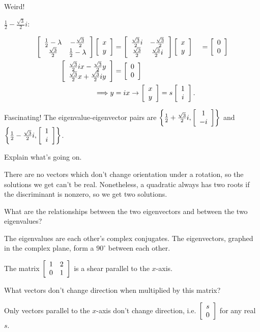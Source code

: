 \documentclass[../key.tex]{subfiles}
\begin{document}
Weird!

$\frac{1}{2} - \frac{\sqrt{3}}{2}i:$

\begin{align*}
\left[\begin{array}{cc} \frac{1}{2} - \lambda & -\frac{\sqrt{3}}{2} \\ \frac{\sqrt{3}}{2} & \frac{1}{2} - \lambda \end{array}\right]\left[\begin{array}{c} x \\ y \end{array}\right] &= \left[\begin{array}{cc} \frac{\sqrt{3}}{2}i & -\frac{\sqrt{3}}{2} \\ \frac{\sqrt{3}}{2} & \frac{\sqrt{3}}{2}i \end{array}\right]\left[\begin{array}{c} x \\ y \end{array}\right] &= \left[\begin{array}{c} 0 \\ 0 \end{array}\right] \\
\left[\begin{array}{c} \frac{\sqrt{3}}{2}ix-\frac{\sqrt{3}}{2}y \\ \frac{\sqrt{3}}{2}x+\frac{\sqrt{3}}{2}iy \end{array}\right] &= \left[\begin{array}{c} 0 \\ 0 \end{array}\right] \\
\Longrightarrow y &= ix \rightarrow \left[\begin{array}{c} x \\ y \end{array}\right] = s\left[\begin{array}{c} 1 \\ i \end{array}\right].
\end{align*}

Fascinating! The eigenvalue-eigenvector pairs are $\left\{\frac{1}{2} + \frac{\sqrt{3}}{2}i, \left[\begin{array}{c} 1 \\ -i \end{array}\right]\right\}$ and $\left\{\frac{1}{2} - \frac{\sqrt{3}}{2}i, \left[\begin{array}{c} 1 \\ i \end{array}\right]\right\}$.

\begin{inner_problem}
\item Explain what's going on.
\end{inner_problem}

There are no vectors which don't change orientation under a rotation, so the solutions we get can't be real. Nonetheless, a quadratic always has two roots if the discriminant is nonzero, so we get two solutions.

\begin{inner_problem}
\item What are the relationships between the two eigenvectors and between the two eigenvalues?
\end{inner_problem}

The eigenvalues are each other's complex conjugates. The eigenvectors, graphed in the complex plane, form a $90^\circ$ between each other.

\begin{outer_problem}
\item The matrix $\left[\begin{array}{cc} 1 & 2 \\ 0 & 1 \end{array}\right]$ is a shear parallel to the $x$-axis.
\end{outer_problem}

\begin{inner_problem}[start=1]
\item What vectors don't change direction when multiplied by this matrix?
\end{inner_problem}

Only vectors parallel to the $x$-axis don't change direction, i.e. $\left[\begin{array}{c} s \\ 0 \end{array}\right]$ for any real $s$.
\end{document}
